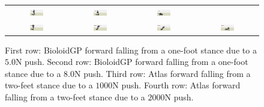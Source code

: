 \begin{figure}[ht]
\begin{tabular}{c c c c}
\includegraphics[width=0.24\textwidth]{images/Atlas_A_1.png}&
\includegraphics[width=0.24\textwidth]{images/Atlas_A_2.png}&
\includegraphics[width=0.24\textwidth]{images/Atlas_A_3.png} \\
\includegraphics[width=0.24\textwidth]{images/Atlas_B_0.png}&
\includegraphics[width=0.24\textwidth]{images/Atlas_B_1.png}&
\includegraphics[width=0.24\textwidth]{images/Atlas_B_2.png}&
\includegraphics[width=0.24\textwidth]{images/Atlas_B_3.png} \\
\end{tabular}
\caption{First row: BioloidGP forward falling from a one-foot
    stance due to a $5.0$N push. Second row: BioloidGP forward falling
    from a one-foot stance due to a $8.0$N push. Third row: Atlas
    forward falling from a two-feet stance due to a $1000$N push. Fourth
    row: Atlas forward falling from a two-feet stance due to a
    $2000$N push.}
  \label{fig:falling_motions}
\end{figure}

